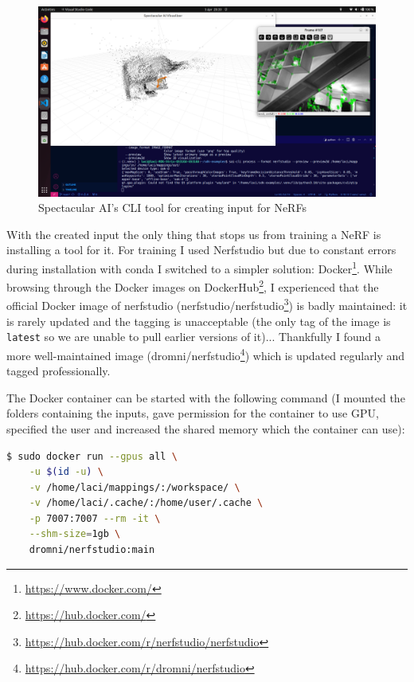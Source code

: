 \begin{figure}[H]
	\centering
	\includegraphics[width=150mm, keepaspectratio]{figures/sai-cli_process.png}
	\caption{Spectacular AI's CLI tool for creating input for NeRFs}
	\label{fig:sai_cli_process}
\end{figure}

With the created input the only thing that stops us from training a NeRF is installing a tool for it. For training I used Nerfstudio\cite{nerfstudio} but due to constant errors during installation with conda I switched to a simpler solution: Docker\footnote{\url{https://www.docker.com/}}. While browsing through the Docker images on DockerHub\footnote{\url{https://hub.docker.com/}}, I experienced that the official Docker image of nerfstudio (nerfstudio/nerfstudio\footnote{\url{https://hub.docker.com/r/nerfstudio/nerfstudio}}) is badly maintained: it is rarely updated and the tagging is unacceptable (the only tag of the image is \verb|latest| so we are unable to pull earlier versions of it)... Thankfully I found a more well-maintained image (dromni/nerfstudio\footnote{\url{https://hub.docker.com/r/dromni/nerfstudio}}) which is updated regularly and tagged professionally.

The Docker container can be started with the following command (I mounted the folders containing the inputs, gave permission for the container to use GPU, specified the user and increased the shared memory which the container can use):

\begin{lstlisting}[language=bash,frame=single,float=!ht]
$ sudo docker run --gpus all \
    -u $(id -u) \
    -v /home/laci/mappings/:/workspace/ \
    -v /home/laci/.cache/:/home/user/.cache \
    -p 7007:7007 --rm -it \
    --shm-size=1gb \
    dromni/nerfstudio:main
\end{lstlisting}

